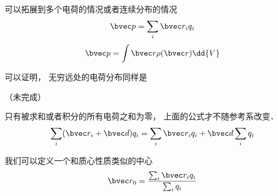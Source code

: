 

可以拓展到多个电荷的情况或者连续分布的情况
\begin{equation}
\bvec p = \sum_i \bvec r_i q_i
\end{equation}
\begin{equation}
\bvec p = \int \bvec r \rho(\bvec r) \dd{V}
\end{equation}

可以证明， 无穷远处的电荷分布同样是

（未完成）

只有被求和或者积分的所有电荷之和为零， 上面的公式才不随参考系改变．
\begin{equation}
\sum_i (\bvec r_i + \bvec d) q_i = \sum_i \bvec r_i q_i + \bvec d \sum_i q_i
\end{equation}

我们可以定义一个和质心性质类似的中心
\begin{equation}
\bvec r_0 = \frac{\sum_i \bvec r_i q_i}{\sum_i q_i}
\end{equation}
